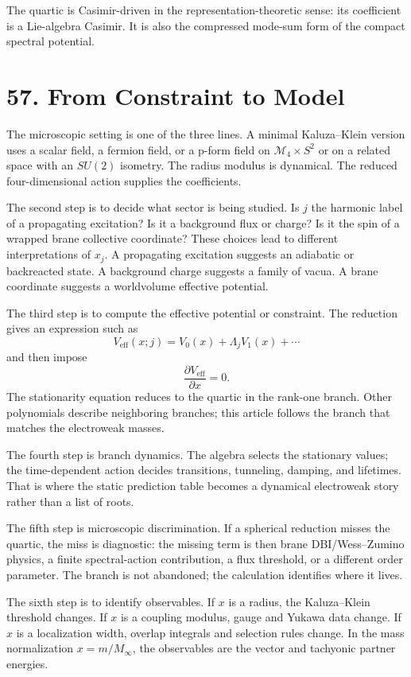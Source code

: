 \documentclass[11pt]{article}
\newcommand{\Lspin}{\Lambda_j}
\begin{document}
The quartic is Casimir-driven in the representation-theoretic sense: its coefficient is a Lie-algebra Casimir. It is also the compressed mode-sum form of the compact spectral potential.

\section*{57. From Constraint to Model}

The microscopic setting is one of the three lines. A minimal Kaluza--Klein version uses a scalar field, a fermion field, or a p-form field on \(\mathcal{M}_4\times S^2\) or on a related space with an \(SU(2)\) isometry. The radius modulus is dynamical. The reduced four-dimensional action supplies the coefficients.

The second step is to decide what sector is being studied. Is \(j\) the harmonic label of a propagating excitation? Is it a background flux or charge? Is it the spin of a wrapped brane collective coordinate? These choices lead to different interpretations of \(x_j\). A propagating excitation suggests an adiabatic or backreacted state. A background charge suggests a family of vacua. A brane coordinate suggests a worldvolume effective potential.

The third step is to compute the effective potential or constraint. The reduction gives an expression such as
\[
        V_{\text{eff}}(x;j)=V_0(x)+\Lspin V_1(x)+\cdots
\]
and then impose
\[
        \frac{\partial V_{\text{eff}}}{\partial x}=0.
\]
The stationarity equation reduces to the quartic in the rank-one branch. Other polynomials describe neighboring branches; this article follows the branch that matches the electroweak masses.

The fourth step is branch dynamics. The algebra selects the stationary values; the time-dependent action decides transitions, tunneling, damping, and lifetimes. That is where the static prediction table becomes a dynamical electroweak story rather than a list of roots.

The fifth step is microscopic discrimination. If a spherical reduction misses the quartic, the miss is diagnostic: the missing term is then brane DBI/Wess--Zumino physics, a finite spectral-action contribution, a flux threshold, or a different order parameter. The branch is not abandoned; the calculation identifies where it lives.

The sixth step is to identify observables. If \(x\) is a radius, the Kaluza--Klein threshold changes. If \(x\) is a coupling modulus, gauge and Yukawa data change. If \(x\) is a localization width, overlap integrals and selection rules change. In the mass normalization \(x=m/M_\infty\), the observables are the vector and tachyonic partner energies.
\end{document}
